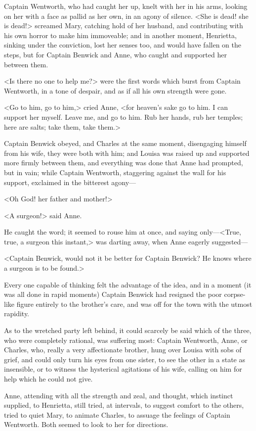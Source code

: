 Captain Wentworth, who had caught her up, knelt with her in his arms, looking on her with a face as pallid as her own, in an agony of silence. <She is dead! she is dead!> screamed Mary, catching hold of her husband, and contributing with his own horror to make him immoveable; and in another moment, Henrietta, sinking under the conviction, lost her senses too, and would have fallen on the steps, but for Captain Benwick and Anne, who caught and supported her between them.

<Is there no one to help me?> were the first words which burst from Captain Wentworth, in a tone of despair, and as if all his own strength were gone.

<Go to him, go to him,> cried Anne, <for heaven's sake go to him. I can support her myself. Leave me, and go to him. Rub her hands, rub her temples; here are salts; take them, take them.>

Captain Benwick obeyed, and Charles at the same moment, disengaging himself from his wife, they were both with him; and Louisa was raised up and supported more firmly between them, and everything was done that Anne had prompted, but in vain; while Captain Wentworth, staggering against the wall for his support, exclaimed in the bitterest agony—

<Oh God! her father and mother!>

<A surgeon!> said Anne.

He caught the word; it seemed to rouse him at once, and saying only—<True, true, a surgeon this instant,> was darting away, when Anne eagerly suggested—

<Captain Benwick, would not it be better for Captain Benwick? He knows where a surgeon is to be found.>

Every one capable of thinking felt the advantage of the idea, and in a moment (it was all done in rapid moments) Captain Benwick had resigned the poor corpse-like figure entirely to the brother's care, and was off for the town with the utmost rapidity.

As to the wretched party left behind, it could scarcely be said which of the three, who were completely rational, was suffering most: Captain Wentworth, Anne, or Charles, who, really a very affectionate brother, hung over Louisa with sobs of grief, and could only turn his eyes from one sister, to see the other in a state as insensible, or to witness the hysterical agitations of his wife, calling on him for help which he could not give.

Anne, attending with all the strength and zeal, and thought, which instinct supplied, to Henrietta, still tried, at intervals, to suggest comfort to the others, tried to quiet Mary, to animate Charles, to assuage the feelings of Captain Wentworth. Both seemed to look to her for directions.

